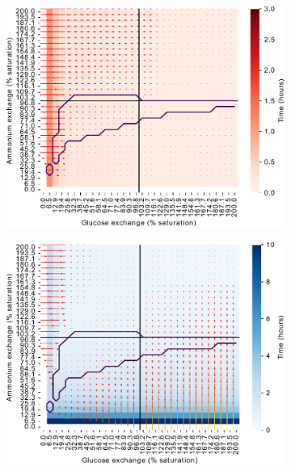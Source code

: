 \begin{figure}
  \begin{subfigure}[t]{0.45\textwidth}
  \centering
    \includegraphics[width=\linewidth]{ec_grid_glc_amm_carb}
    \caption{
    }
    \label{fig:model-grid-glc-carb}
  \end{subfigure}%
  \begin{subfigure}[t]{0.45\textwidth}
  \centering
    \includegraphics[width=\linewidth]{ec_grid_glc_amm_prot}
    \caption{
    }
    \label{fig:model-grid-glc-prot}
  \end{subfigure}


\end{figure}
